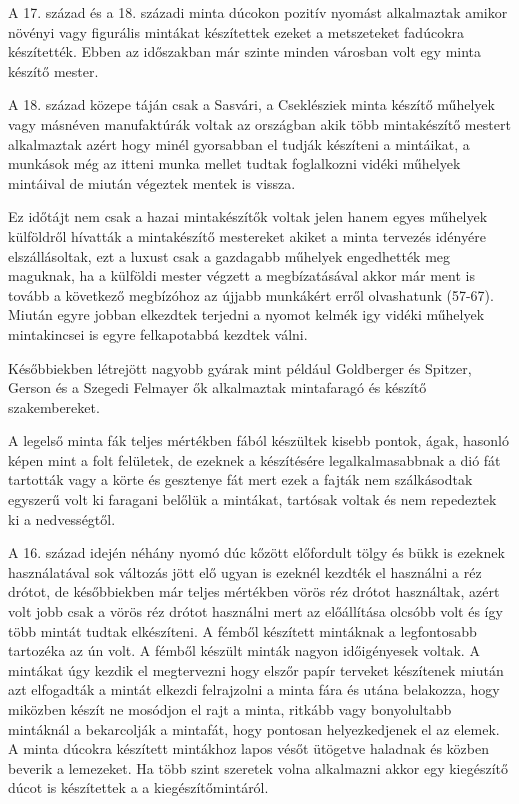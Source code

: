 \documentclass[fontsize=12pt, appendixprefix=true]{scrreprt}
\begin{document}
A 17. század és a 18. századi minta dúcokon pozitív nyomást alkalmaztak amikor növényi vagy figurális mintákat készítettek ezeket a metszeteket fadúcokra készítették. Ebben az időszakban már szinte minden városban volt egy minta készítő mester.

A 18. század közepe táján csak a Sasvári, a Cseklésziek minta készítő műhelyek vagy másnéven manufaktúrák  voltak az országban akik több mintakészítő mestert alkalmaztak azért hogy minél gyorsabban el tudják készíteni a mintáikat, a munkások még az itteni munka mellet tudtak foglalkozni vidéki műhelyek mintáival de miután végeztek mentek is vissza. 

Ez időtájt nem csak a hazai mintakészítők voltak jelen hanem egyes műhelyek külföldről hívatták a mintakészítő mestereket akiket a minta tervezés idényére elszállásoltak, ezt a luxust csak a gazdagabb műhelyek engedhették meg maguknak, ha a külföldi mester végzett a megbízatásával akkor már ment is tovább a következő megbízóhoz az újjabb munkákért erről olvashatunk \cite{domonkos1981magyarorszagi} (57-67).
Miután egyre jobban elkezdtek terjedni a nyomot kelmék igy vidéki műhelyek mintakincsei is egyre felkapotabbá kezdtek válni.

Későbbiekben létrejött nagyobb gyárak mint például Goldberger és Spitzer, Gerson és a Szegedi Felmayer ők alkalmaztak mintafaragó és készítő szakembereket.

A legelső minta fák teljes mértékben fából készültek kisebb pontok, ágak, hasonló képen mint a folt felületek, de ezeknek a készítésére legalkalmasabbnak a dió fát tartották vagy a körte és gesztenye fát mert ezek a fajták nem szálkásodtak egyszerű volt ki faragani belőlük a mintákat, tartósak voltak és nem repedeztek ki a nedvességtől.

A 16. század idején néhány nyomó dúc kőzött előfordult tölgy és bükk is ezeknek használatával sok változás jött elő ugyan is ezeknél kezdték el használni a réz drótot, de későbbiekben már teljes mértékben vörös réz drótot használtak, azért volt jobb csak a vörös réz drótot használni mert az előállítása olcsóbb volt és így több mintát tudtak elkészíteni.
A fémből készített mintáknak a legfontosabb tartozéka az ún volt. A fémből készült minták nagyon időigényesek voltak. A mintákat úgy kezdik el megtervezni hogy elszőr papír terveket készítenek miután azt elfogadták a mintát elkezdi felrajzolni a minta fára és utána belakozza, hogy miközben készít ne mosódjon el rajt a minta, ritkább vagy bonyolultabb mintáknál a bekarcolják a mintafát, hogy pontosan helyezkedjenek el az elemek.
A minta dúcokra készített mintákhoz lapos vésőt ütögetve haladnak és közben beverik a lemezeket. Ha több szint szeretek volna alkalmazni akkor egy kiegészítő dúcot is készítettek a a kiegészítőmintáról.
\end{document}
